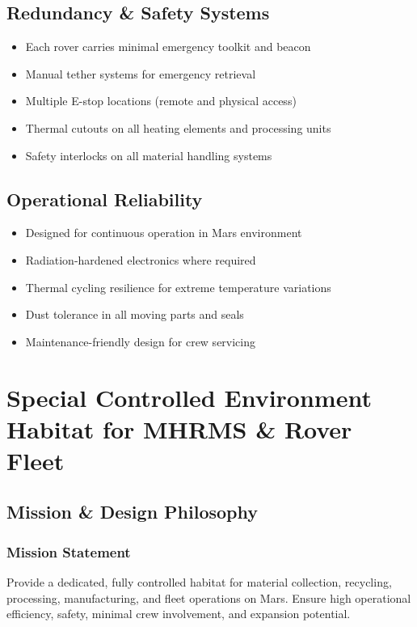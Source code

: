 \documentclass[12pt, a4paper]{article}
\begin{document}
\subsection{Redundancy \& Safety Systems}
\begin{itemize}
    \item Each rover carries minimal emergency toolkit and beacon
    \item Manual tether systems for emergency retrieval
    \item Multiple E-stop locations (remote and physical access)
    \item Thermal cutouts on all heating elements and processing units
    \item Safety interlocks on all material handling systems
\end{itemize}

\subsection{Operational Reliability}
\begin{itemize}
    \item Designed for continuous operation in Mars environment
    \item Radiation-hardened electronics where required
    \item Thermal cycling resilience for extreme temperature variations
    \item Dust tolerance in all moving parts and seals
    \item Maintenance-friendly design for crew servicing
\end{itemize}

\section{Special Controlled Environment Habitat for MHRMS \& Rover Fleet}

\subsection{Mission \& Design Philosophy}

\subsubsection{Mission Statement}
Provide a dedicated, fully controlled habitat for material collection, recycling, processing, manufacturing, and fleet operations on Mars. Ensure high operational efficiency, safety, minimal crew involvement, and expansion potential.
\end{document}
